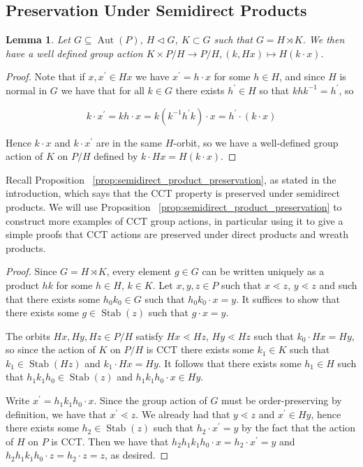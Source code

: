 \documentclass[10 pt]{amsart}
\theoremstyle{plain}
\newtheorem{lem}[thm]{Lemma}
\theoremstyle{definition}
\theoremstyle{remark}
\numberwithin{equation}{section}
\newcommand\ssec{\subsection}
\def\Stab{\operatorname{Stab}}
\begin{document}
\ssec{Preservation Under Semidirect Products}
\label{ssec:semidirect_product_preservation}

\begin{lem}
Let $G\subseteq\operatorname{Aut}(P)$, $H\triangleleft G$, $K\subset G$ such that $G = H\rtimes K$. We then have a well defined group action $K \times P/H \rightarrow P/H,(k,Hx) \mapsto H(k \cdot x).$

\end{lem}
\begin{proof}

Note that if $x,x^\prime\in Hx$ we have $x^\prime = h\cdot x$ for some $h\in H$, and since $H$ is normal in $G$ we have that for all $k \in G$ there exists $h^\prime \in H$ so that $khk^{-1} = h^\prime$, so 

$$k\cdot x^\prime = kh\cdot x = k(k^{-1}h^\prime k)\cdot x = h^\prime\cdot (k\cdot x)$$

Hence $k\cdot x$ and $k\cdot x^\prime$ are in the same $H$-orbit, so we have a well-defined group action of $K$ on $P/H$ defined by $k\cdot Hx = H(k\cdot x)$.
\end{proof}

Recall Proposition ~\ref{prop:semidirect_product_preservation}, as stated in the introduction, which says that the CCT property is preserved under semidirect products.  We will use Proposition ~\ref{prop:semidirect_product_preservation} to construct more examples of CCT group actions, in particular using it to give a simple proofs that CCT actions are preserved under direct products and wreath products.

\semidirect*



\begin{proof}
Since $G = H\rtimes K$, every element $g\in G$ can be written uniquely as a product $hk$ for some $h\in H$, $k\in K$.  Let $x,y,z\in P$ such that $x\lessdot z$, $y\lessdot z$ and such that there exists some $h_0k_0\in G$ such that $h_0k_0\cdot x = y$.  It suffices to show that there exists some $g\in \Stab(z)$ such that $g\cdot x = y$.

The orbits $Hx, Hy, Hz\in P/H$ satisfy $Hx\lessdot Hz$, $Hy\lessdot Hz$ such that $k_0\cdot Hx = Hy$, so since the action of $K$ on $P/H$ is CCT there exists some $k_1\in K$ such that $k_1\in \Stab(Hz)$ and $k_1\cdot Hx = Hy$.  It follows that there exists some $h_1\in H$ such that $h_1k_1h_0\in \Stab(z)$ and $h_1k_1h_0\cdot x\in Hy$.

Write $x^\prime = h_1k_1h_0\cdot x$.  Since the group action of $G$ must be order-preserving by definition, we have that $x^\prime \lessdot z$.  We already had that $y\lessdot z$ and $x^\prime\in Hy$, hence there exists some $h_2\in \Stab(z)$ such that $h_2\cdot x^\prime = y$ by the fact that the action of $H$ on $P$ is CCT.  Then we have that $h_2h_1k_1h_0\cdot x = h_2\cdot x^\prime = y$ and $h_2h_1k_1h_0\cdot z = h_2\cdot z = z$, as desired.
\end{proof}
\end{document}
